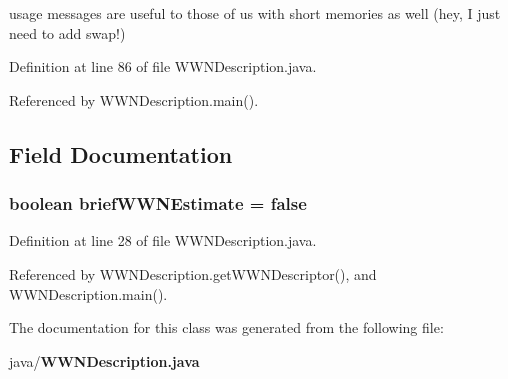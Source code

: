 usage messages are useful to those of us with short memories as well (hey, \-I just need to add swap!) 



\-Definition at line 86 of file \-W\-W\-N\-Description.\-java.



\-Referenced by \-W\-W\-N\-Description.\-main().



\subsection{\-Field \-Documentation}
\subsubsection[{brief\-W\-W\-N\-Estimate}]{\setlength{\rightskip}{0pt plus 5cm}boolean {\bf brief\-W\-W\-N\-Estimate} = false}\label{classorg_1_1smallfoot_1_1wwn_1_1WWNDescription_a48cfcc3bfbc4d22cd4ad0fb8c46aeff8}


\-Definition at line 28 of file \-W\-W\-N\-Description.\-java.



\-Referenced by \-W\-W\-N\-Description.\-get\-W\-W\-N\-Descriptor(), and \-W\-W\-N\-Description.\-main().



\-The documentation for this class was generated from the following file\-:\begin{DoxyCompactItemize}
\item 
java/{\bf \-W\-W\-N\-Description.\-java}\end{DoxyCompactItemize}
